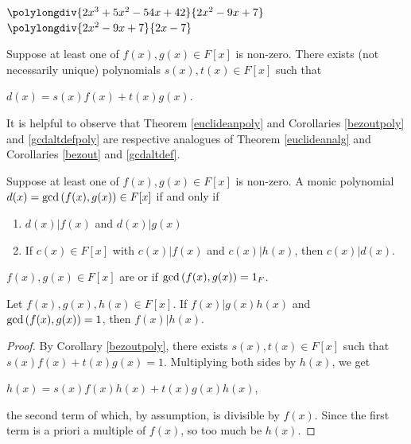 \documentclass[11pt,fleqn,dvipsnames,usenames]{article}
\newcommand{\p}{\noindent}
\begin{document}
$\polylongdiv{2x^3 + 5x^2 - 54x + 42}{2x^2 - 9x + 7}$ \hfill $\polylongdiv{2x^2 - 9x + 7}{2x-7}$
\vspace{1cm}
\newpage

\begin{corollary}\label{bezoutpoly}
Suppose at least one of $f(x),g(x)\in F[x]$ is non-zero.  There exists (not necessarily unique) polynomials $s(x),t(x)\in F[x]$ such that
\begin{center}
$d(x) = s(x)f(x) + t(x)g(x)$.
\end{center}
\end{corollary}
\vsp

%
\p It is helpful to observe that Theorem \ref{euclideanpoly} and Corollaries \ref{bezoutpoly} and \ref{gcdaltdefpoly} are respective analogues of Theorem \ref{euclideanalg} and Corollaries \ref{bezout} and \ref{gcdaltdef}.
\vsp

\p {\color{blue}Example?}
\vsp

\begin{corollary}\label{gcdaltdefpoly}
Suppose at least one of $f(x),g(x)\in F[x]$ is non-zero.  A monic polynomial $d(x) = \text{gcd}\left(f(x),g(x)\right)\in F[x]$ if and only if
\begin{enumerate}[(1)]
\item $d(x)|f(x)$ and $d(x)|g(x)$
\item If $c(x)\in F[x]$ with $c(x)|f(x)$ and $c(x)|h(x)$, then $c(x)|d(x)$.
\end{enumerate}
\end{corollary}
\vsmsp

%
\begin{definition}
$f(x),g(x)\in F[x]$ are  or  if $\text{gcd}\left(f(x),g(x)\right) = 1_{F}$.
\end{definition}
\vsmsp

%
\begin{theorem}\label{pdividesborcpoly}
Let $f(x),g(x),h(x)\in F[x]$.  If $f(x)|g(x)h(x)$ and $\text{gcd}\left(f(x),g(x)\right) = 1$, then $f(x)|h(x)$.
\end{theorem}
%
\begin{proof}
By Corollary \ref{bezoutpoly}, there exists $s(x),t(x)\in F[x]$ such that $s(x)f(x) + t(x)g(x) = 1$.  Multiplying both sides by $h(x)$, we get
\begin{center}
$h(x) = s(x)f(x)h(x) + t(x)g(x)h(x)$,
\end{center}
the second term of which, by assumption, is divisible by $f(x)$.  Since the first term is a priori a multiple of $f(x)$, so too much be $h(x)$.
\end{proof}
%
\end{document}
